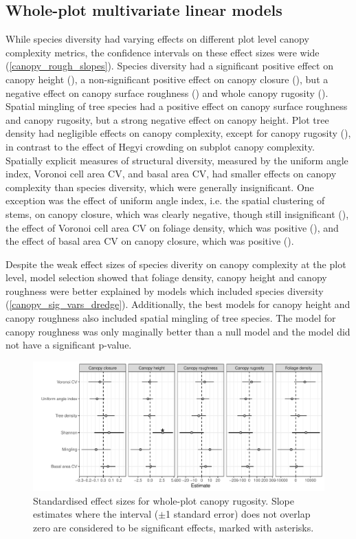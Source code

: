 \documentclass[11pt,a4paper]{article}
\begin{document}


\subsection{Whole-plot multivariate linear models}

While species diversity had varying effects on different plot level canopy complexity metrics, the confidence intervals on these effect sizes were wide (\autoref{canopy_rough_slopes}). Species diversity had a significant positive effect on canopy height (\shannonHeightP{}), a non-significant positive effect on canopy closure (\shannonCoverP{}), but a negative effect on canopy surface roughness (\shannonRoughP{}) and whole canopy rugosity (\shannonRugP{}). Spatial mingling of tree species had a positive effect on canopy surface roughness and canopy rugosity, but a strong negative effect on canopy height. Plot tree density had negligible effects on canopy complexity, except for canopy rugosity (\treeDensRugP{}), in contrast to the effect of Hegyi crowding on subplot canopy complexity. Spatially explicit measures of structural diversity, measured by the uniform angle index, Voronoi cell area CV, and basal area CV, had smaller effects on canopy complexity than species diversity, which were generally insignificant. One exception was the effect of uniform angle index, i.e. the spatial clustering of stems, on canopy closure, which was clearly negative, though still insignificant (\wiCoverP{}), the effect of Voronoi cell area CV on foliage density, which was positive (\voronoiDensP{}), and the effect of basal area CV on canopy closure, which was positive (\baCoverP{}). 

Despite the weak effect sizes of species diverity on canopy complexity at the plot level, model selection showed that foliage density, canopy height and canopy roughness were better explained by models which included species diversity (\autoref{canopy_sig_vars_dredge}). Additionally, the best models for canopy height and canopy roughness also included spatial mingling of tree species. The model for canopy roughness was only maginally better than a null model and the model did not have a significant p-value.

\begin{figure}
	\includegraphics[width=\linewidth]{canopy_rough_slopes}
	\caption{Standardised effect sizes for whole-plot canopy rugosity. Slope estimates where the interval ($\pm$1 standard error) does not overlap zero are considered to be significant effects, marked with asterisks.}
	\label{canopy_rough_slopes}
\end{figure}
\end{document}
